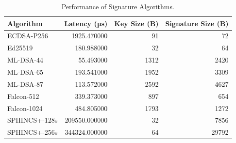\begin{table}
\caption{Performance of Signature Algorithms.}
\label{tab:sig_perf}
\begin{tabular}{lrrr}
\toprule
Algorithm & Latency (µs) & Key Size (B) & Signature Size (B) \\
\midrule
ECDSA-P256 & 1925.470000 & 91 & 72 \\
Ed25519 & 180.988000 & 32 & 64 \\
ML-DSA-44 & 55.493000 & 1312 & 2420 \\
ML-DSA-65 & 193.541000 & 1952 & 3309 \\
ML-DSA-87 & 113.572000 & 2592 & 4627 \\
Falcon-512 & 339.373000 & 897 & 654 \\
Falcon-1024 & 484.805000 & 1793 & 1272 \\
SPHINCS+-128s & 209550.000000 & 32 & 7856 \\
SPHINCS+-256s & 344324.000000 & 64 & 29792 \\
\bottomrule
\end{tabular}
\end{table}
